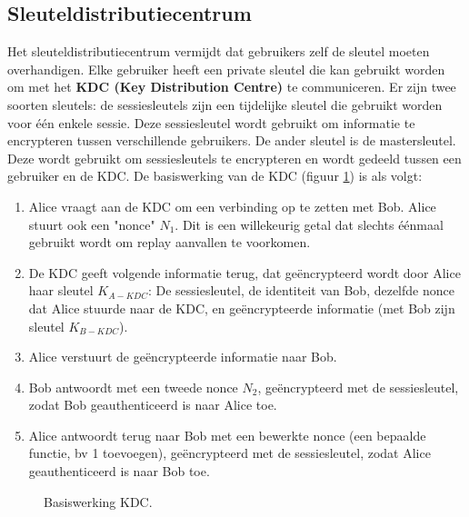\documentclass{report}
\begin{document}
	\subsection{Sleuteldistributiecentrum}
	Het sleuteldistributiecentrum vermijdt dat gebruikers zelf de sleutel moeten overhandigen. Elke gebruiker heeft een private sleutel die kan gebruikt worden om met het \textbf{KDC (Key Distribution Centre)} te communiceren. Er zijn twee soorten sleutels: de sessiesleutels zijn een tijdelijke sleutel die gebruikt worden voor één enkele sessie. Deze sessiesleutel wordt gebruikt om informatie te encrypteren tussen verschillende gebruikers. De ander sleutel is de mastersleutel. Deze wordt gebruikt om sessiesleutels te encrypteren en wordt gedeeld tussen een gebruiker en de KDC. De basiswerking van de KDC (figuur \ref{fig:basiswerkingKDC}) is als volgt:
	\begin{enumerate}
		\item Alice vraagt aan de KDC om een verbinding op te zetten met Bob. Alice stuurt ook een "nonce" $N_1$. Dit is een willekeurig getal dat slechts éénmaal gebruikt wordt om replay aanvallen te voorkomen.
		\item De KDC geeft volgende informatie terug, dat geëncrypteerd wordt door Alice haar sleutel $K_{A-KDC}$: De sessiesleutel, de identiteit van Bob, dezelfde nonce dat Alice stuurde naar de KDC, en geëncrypteerde informatie (met Bob zijn sleutel $K_{B-KDC}$).
		\item Alice verstuurt de geëncrypteerde informatie naar Bob.
		\item Bob antwoordt met een tweede nonce $N_2$, geëncrypteerd met de sessiesleutel, zodat Bob geauthenticeerd is naar Alice toe.
		\item Alice antwoordt terug naar Bob met een bewerkte nonce (een bepaalde functie, bv 1 toevoegen), geëncrypteerd met de sessiesleutel, zodat Alice geauthenticeerd is naar Bob toe.
	\end{enumerate}
	\begin{figure}
		\centering
		\caption{Basiswerking KDC.}
		\label{fig:basiswerkingKDC}
	\end{figure}
\end{document}
